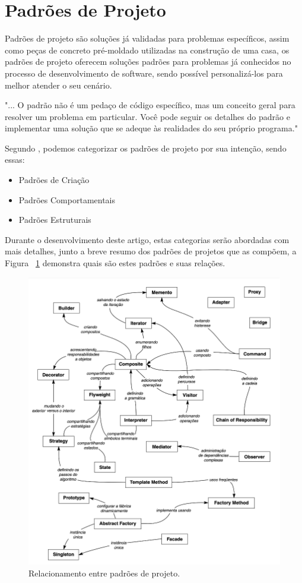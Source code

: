 \documentclass[12pt]{article}
\begin{document}
\section{Padrões de Projeto} \label{sec:firstpage}

Padrões de projeto são soluções já validadas para problemas específicos, 
assim como peças de concreto pré-moldado utilizadas na construção de 
uma casa, os padrões de projeto oferecem soluções padrões para 
problemas já conhecidos no processo de desenvolvimento de software, 
sendo possível personalizá-los para melhor atender o seu cenário.

"... O padrão não é um pedaço de código específico, mas um conceito geral 
para resolver um problema em particular. Você pode seguir os detalhes do 
padrão e implementar uma solução que se adeque às realidades do seu 
próprio programa." \cite{guru}

Segundo \cite{gof}, podemos categorizar os padrões de projeto por sua 
intenção, sendo essas:

\begin{itemize}
\item Padrões de Criação
\item Padrões Comportamentais
\item Padrões Estruturais
\end{itemize}

Durante o desenvolvimento deste artigo, estas categorias serão 
abordadas com mais detalhes, junto a breve resumo dos padrões de 
projetos que as compõem, a Figura ~\ref{fig:fig1} demonstra
quais são estes padrões e suas relações.

\begin{figure}[ht]
\centering
\includegraphics[width=.9\textwidth]{Imagem1.png}
\caption{Relacionamento entre padrões de projeto. \cite{gof}}
\label{fig:fig1}
\end{figure}
\end{document}
